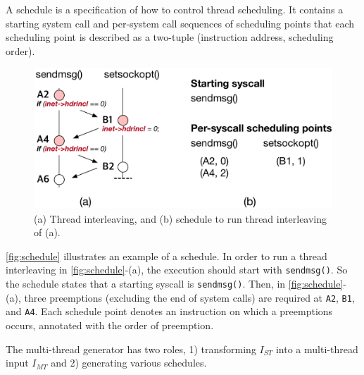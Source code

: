 %
A schedule is a specification of how to control thread scheduling.
%
It contains a starting system call and per-system call sequences of
scheduling points that each scheduling point is described as a
two-tuple (instruction address, scheduling order).

\begin{figure}[t]
  \centering
  \includegraphics[width=0.75\linewidth]{fig/schedule.pdf}
  \caption{(a) Thread interleaving, and (b) schedule to run thread
    interleaving of (a).}
  \label{fig:schedule}
\end{figure}

\autoref{fig:schedule} illustrates an example of a schedule. In order
to run a thread interleaving in \autoref{fig:schedule}-(a), the
execution should start with \texttt{sendmsg()}. So the schedule states
that a starting syscall is \texttt{sendmsg()}.
%
Then, in \autoref{fig:schedule}-(a), three preemptions (excluding the
end of system calls) are required at \texttt{A2}, \texttt{B1}, and
\texttt{A4}. Each schedule point denotes an instruction on which a
preemptions occurs, annotated with the order of preemption.






%
%
%
%
%
The multi-thread generator has two roles, 1) transforming $I_{ST}$
into a multi-thread input $I_{MT}$ and 2) generating various
schedules.






